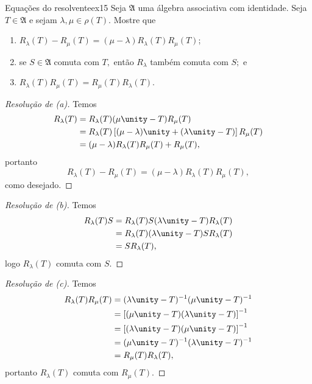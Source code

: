 \begin{exercício}{Equações do resolvente}{ex15}
  Seja \(\mathfrak{A}\) uma álgebra associativa com identidade. Seja \(T \in \mathfrak{A}\) e sejam \(\lambda, \mu \in \rho(T).\) Mostre que
    \begin{enumerate}[label=(\alph*)]
        \item \(R_\lambda(T) - R_\mu(T) = (\mu - \lambda) R_\lambda(T) R_\mu(T)\);
        \item se \(S \in \mathfrak{A}\) comuta com \(T,\) então \(R_\lambda\) também comuta com \(S;\) e
        \item \(R_\lambda(T)R_\mu(T) = R_\mu(T)R_\lambda(T)\).
    \end{enumerate}
\end{exercício}
\begin{proof}[Resolução de (a)]
  Temos
  \begin{align*}
    R_\lambda(T) &= R_\lambda(T) (\mu \unity - T) R_\mu(T)\\
                 &= R_\lambda(T) \left[(\mu - \lambda)\unity + (\lambda \unity - T)\right] R_\mu(T)\\
                 &= (\mu - \lambda)R_\lambda(T) R_\mu(T) + R_\mu(T),
  \end{align*}
  portanto
  \begin{equation*}
    R_\lambda(T) - R_\mu(T) = (\mu - \lambda)R_{\lambda}(T) R_\mu(T),
  \end{equation*}
  como desejado.
\end{proof}
\begin{proof}[Resolução de (b)]
  Temos
  \begin{align*}
    R_\lambda(T) S &= R_\lambda(T) S (\lambda \unity - T) R_\lambda(T)\\
                   &= R_\lambda(T) (\lambda\unity - T) S R_\lambda(T)\\
                   &= S R_{\lambda}(T),
  \end{align*}
  logo \(R_{\lambda}(T)\) comuta com \(S.\)
\end{proof}
\begin{proof}[Resolução de (c)]
  Temos
  \begin{align*}
    R_\lambda(T) R_\mu(T) &= (\lambda \unity - T)^{-1} (\mu\unity - T)^{-1}\\
                          &= \left[(\mu \unity - T) (\lambda \unity - T)\right]^{-1}\\
                          &= \left[(\lambda \unity - T)(\mu \unity - T)\right]^{-1}\\
                          &= (\mu \unity - T)^{-1} (\lambda \unity - T)^{-1}\\
                          &= R_\mu(T) R_\lambda(T),
  \end{align*}
  portanto \(R_\lambda(T)\) comuta com \(R_\mu(T).\)
\end{proof}
